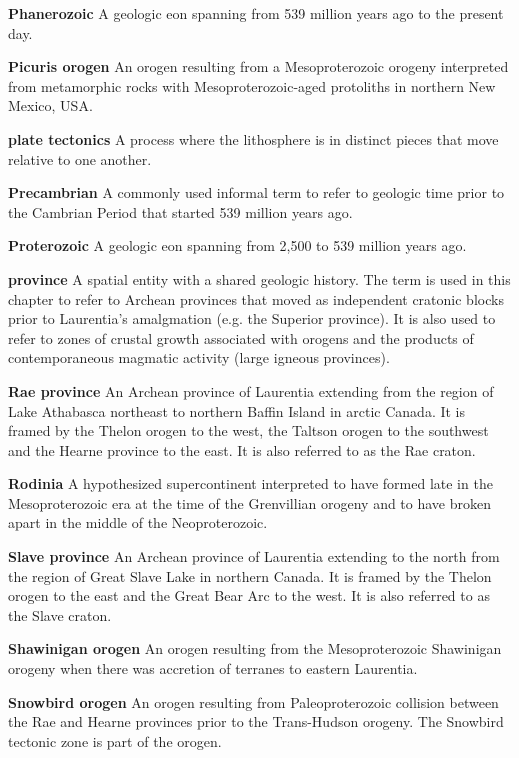 \documentclass[twocolumn, switch]{article} %
\begin{document}
\noindent\textbf{Phanerozoic } A geologic eon spanning from 539 million years ago to the present day.

\noindent\textbf{Picuris orogen } An orogen resulting from a Mesoproterozoic orogeny interpreted from metamorphic rocks with Mesoproterozoic-aged protoliths in northern New Mexico, USA.

\noindent\textbf{plate tectonics } A process where the lithosphere is in distinct pieces that move relative to one another. 

\noindent\textbf{Precambrian } A commonly used informal term to refer to geologic time prior to the Cambrian Period that started 539 million years ago.

\noindent\textbf{Proterozoic } A geologic eon spanning from 2,500 to 539 million years ago.

\noindent\textbf{province } A spatial entity with a shared geologic history. The term is used in this chapter to refer to Archean provinces that moved as independent cratonic blocks prior to Laurentia's amalgmation (e.g. the Superior province). It is also used to refer to zones of crustal growth associated with orogens and the products of contemporaneous magmatic activity (large igneous provinces).

\noindent\textbf{Rae province } An Archean province of Laurentia extending from the region of Lake Athabasca northeast to northern Baffin Island in arctic Canada. It is framed by the Thelon orogen to the west, the Taltson orogen to the southwest and the Hearne province to the east. It is also referred to as the Rae craton.

\noindent\textbf{Rodinia } A hypothesized supercontinent interpreted to have formed late in the Mesoproterozoic era at the time of the Grenvillian orogeny and to have broken apart in the middle of the Neoproterozoic.

\noindent\textbf{Slave province } An Archean province of Laurentia extending to the north from the region of Great Slave Lake in northern Canada. It is framed by the Thelon orogen to the east and the Great Bear Arc to the west. It is also referred to as the Slave craton.

\noindent\textbf{Shawinigan orogen } An orogen resulting from the Mesoproterozoic Shawinigan orogeny when there was accretion of terranes to eastern Laurentia.

\noindent\textbf{Snowbird orogen } An orogen resulting from Paleoproterozoic collision between the Rae and Hearne provinces prior to the Trans-Hudson orogeny. The Snowbird tectonic zone is part of the orogen.
\end{document}
